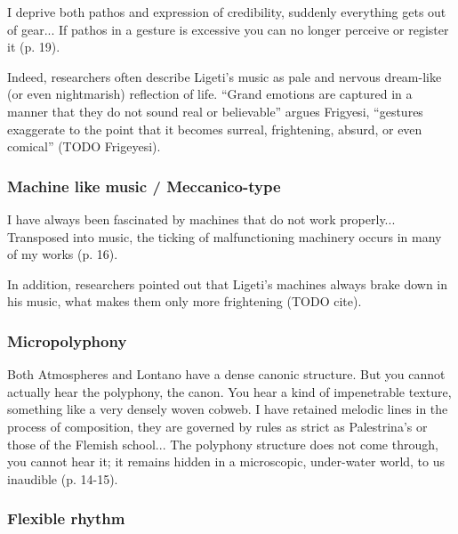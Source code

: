 \documentclass[a4paper,11pt]{article}
\newenvironment{MyShadequote}[1][]
    {\begin{mdframed}[style=MyShadeQuoteStyle,#1]}
    {\end{mdframed}}
\begin{document}
\begin{MyShadequote}
  I deprive both pathos and expression of credibility, suddenly everything gets out of gear...
  If pathos in a gesture is excessive you can no longer perceive or register it (p. 19).
\end{MyShadequote}

Indeed, researchers often describe Ligeti's music as pale and nervous dream-like (or even nightmarish) reflection of life.
``Grand emotions are captured in a manner that they do not sound real or believable'' argues Frigyesi, ``gestures exaggerate to the point that it becomes surreal, frightening, absurd, or even comical'' (TODO Frigeyesi).

\subsubsection{Machine like music / Meccanico-type}
\label{subs:ligeti:machine}

\begin{MyShadequote}
  I have always been fascinated by machines that do not work properly...
  Transposed into music, the ticking of malfunctioning machinery occurs in many of my works (p. 16).
\end{MyShadequote}

In addition, researchers pointed out that Ligeti's machines always brake down in his music, what makes them only more frightening (TODO cite).

\subsubsection{Micropolyphony}
\label{subs:ligeti:micropolyphony}

\begin{MyShadequote}
  Both Atmospheres and Lontano have a dense canonic structure.
  But you cannot actually hear the polyphony, the canon.
  You hear a kind of impenetrable texture, something like a very densely woven cobweb.
  I have retained melodic lines in the process of composition, they are governed by rules as strict as Palestrina’s or those of the Flemish school...
  The polyphony structure does not come through, you cannot hear it; it remains hidden in a microscopic, under-water world, to us inaudible (p. 14-15).
\end{MyShadequote}

\subsubsection{Flexible rhythm}
\label{subs:ligeti:flexible}
\end{document}
